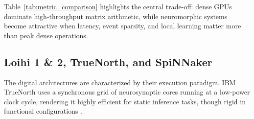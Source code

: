 \documentclass[11pt]{article}
\begin{document}
\begin{table}[htbp]
    \centering
    \caption{Metric-Oriented Comparison of Representative Neuromorphic and Dense Platforms \cite{merolla2014truenorth,davies2018loihi,davies2021loihi,intel2024halapoint,furber2014spinnaker,kudithipudi2025scale,nvidia2020a100}}
    \label{tab:metric_comparison}
\end{table}

Table~\ref{tab:metric_comparison} highlights the central trade-off: dense GPUs dominate high-throughput matrix arithmetic, while neuromorphic systems become attractive when latency, event sparsity, and local learning matter more than peak dense operations.

\subsection{Loihi 1 \& 2, TrueNorth, and SpiNNaker}
The digital architectures are characterized by their execution paradigm. IBM TrueNorth uses a synchronous grid of neurosynaptic cores running at a low-power clock cycle, rendering it highly efficient for static inference tasks, though rigid in functional configurations \cite{schuman2017survey,mead1990neuromorphic}. 
\end{document}
